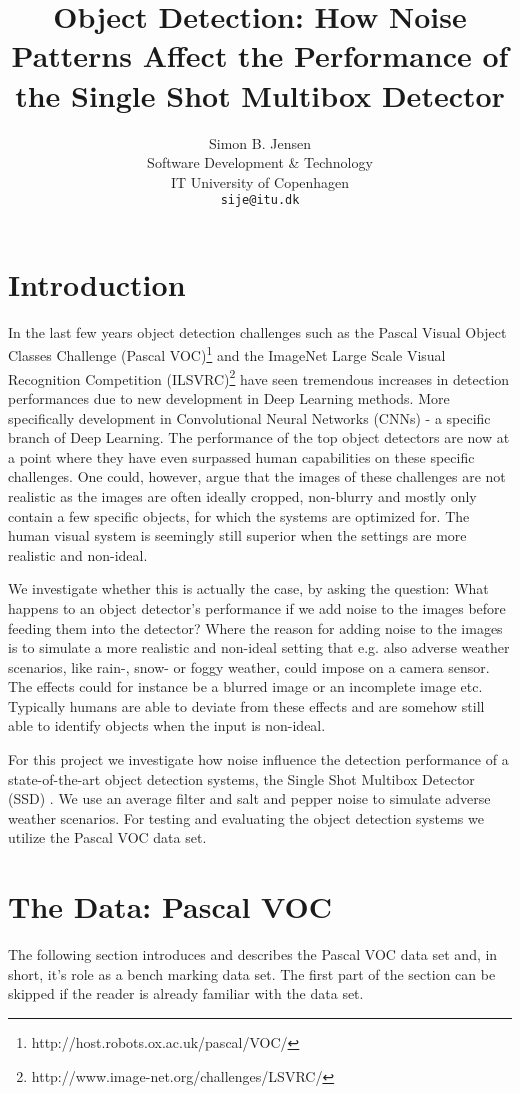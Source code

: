 \documentclass{article}
\title{Object Detection: How Noise Patterns Affect the Performance of the Single Shot Multibox Detector}
\author{
  Simon B. Jensen\\
  Software Development \& Technology\\
  IT University of Copenhagen\\
  \texttt{sije@itu.dk} \\
}
\begin{document}

\maketitle

\section{Introduction}
\label{sec:introduction}
In the last few years object detection challenges such as the Pascal Visual Object Classes Challenge (Pascal VOC)\footnote{http://host.robots.ox.ac.uk/pascal/VOC/} and the ImageNet Large Scale Visual Recognition Competition (ILSVRC)\footnote{http://www.image-net.org/challenges/LSVRC/} have seen tremendous increases in detection performances due to new development in Deep Learning methods. More specifically development in Convolutional Neural Networks (CNNs) - a specific branch of Deep Learning. The performance of the top object detectors are now at a point where they have even surpassed human capabilities on these specific challenges. One could, however, argue that the images of these challenges are not realistic as the images are often ideally cropped, non-blurry and mostly only contain a few specific objects, for which the systems are optimized for. The human visual system is seemingly still superior when the settings are more realistic and non-ideal. 

We investigate whether this is actually the case, by asking the question: What happens to an object detector's performance if we add noise to the images before feeding them into the detector? Where the reason for adding noise to the images is to simulate a more realistic and non-ideal setting that e.g. also adverse weather scenarios, like rain-, snow- or foggy weather, could impose on a camera sensor. The effects could for instance be a blurred image or an incomplete image etc. Typically humans are able to deviate from these effects and are somehow still able to identify objects when the input is non-ideal. 

For this project we investigate how noise influence the detection performance of a state-of-the-art object detection systems, the Single Shot Multibox Detector (SSD) \citep{SSD}. We use an average filter and salt and pepper noise to simulate adverse weather scenarios. For testing and evaluating the object detection systems we utilize the Pascal VOC data set.  

\section{The Data: Pascal VOC}
The following section introduces and describes the Pascal VOC data set and, in short, it's role as a bench marking data set. The first part of the section can be skipped if the reader is already familiar with the data set.
\end{document}
